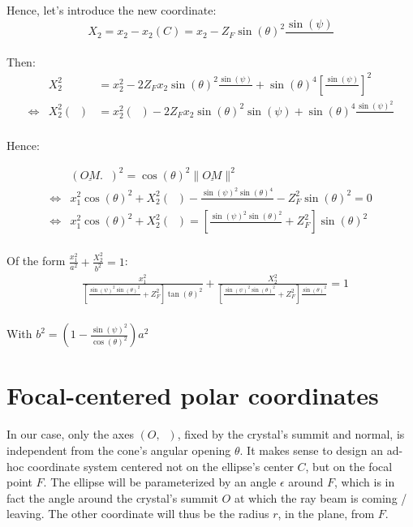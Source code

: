 \documentclass[a4paper,11pt,twoside,titlepage,openright]{book}
\numberwithin{equation}{section}
\newcommand{\lt}{\left}
\newcommand{\rt}{\right}
\DeclareMathOperator{\ez}{\underline{e}_z}
\DeclareMathOperator{\DD}{\cos(\theta)^2 - \sin(\psi)^2}
\begin{document}
Hence, let's introduce the new coordinate:
$$
X_2 = x_2 - x_2(C) = x_2 - Z_F\sin(\theta)^2 \frac{\sin(\psi)}{\DD}
$$

Then:
$$
\begin{array}{lll}
	& X_2^2 & = x_2^2 - 2Z_Fx_2\sin(\theta)^2 \frac{\sin(\psi)}{\DD} + \sin(\theta)^4 \lt[\frac{\sin(\psi)}{\DD}\rt]^2\\
	\Leftrightarrow & X_2^2\lt(\DD\rt) & = x_2^2\lt(\DD\rt) - 2Z_Fx_2\sin(\theta)^2\sin(\psi) + \sin(\theta)^4 \frac{\sin(\psi)^2}{\DD}\\
\end{array}
$$

Hence:

$$
\begin{array}{lll}
	& (\underline{OM}.\ez)^2 = \cos(\theta)^2 \|\underline{OM}\|^2\\
	\Leftrightarrow & x_1^2\cos(\theta)^2 + X_2^2\lt(\DD\rt) - \frac{\sin(\psi)^2\sin(\theta)^4}{\DD} - Z_F^2\sin(\theta)^2 = 0\\
	\Leftrightarrow & x_1^2\cos(\theta)^2 + X_2^2\lt(\DD\rt) = \lt[\frac{\sin(\psi)^2\sin(\theta)^2}{\DD} + Z_F^2\rt]\sin(\theta)^2\\
\end{array}
$$

Of the form $\frac{x_1^2}{a^2} + \frac{X_2^2}{b^2} = 1$:
$$
\begin{array}{lll}
	& \frac{x_1^2}{\lt[\frac{\sin(\psi)^2\sin(\theta)^2}{\DD} + Z_F^2\rt]\tan(\theta)^2} + \frac{X_2^2}{\lt[\frac{\sin(\psi)^2\sin(\theta)^2}{\DD} + Z_F^2\rt]\frac{\sin(\theta)^2}{\DD}} = 1\\
\end{array}
$$

With $b^2 = \lt(1-\frac{\sin(\psi)^2}{\cos(\theta)^2}\rt)a^2$

\section{Focal-centered polar coordinates}

In our case, only the axes $(O, \ez)$, fixed by the crystal's summit and normal, is independent from the cone's angular opening $\theta$.
It makes sense to design an ad-hoc coordinate system centered not on the ellipse's center $C$, but on the focal point $F$.
The ellipse will be parameterized by an angle $\epsilon$ around $F$, which is in fact the angle around the crystal's summit $O$ at which the ray beam is coming / leaving.
The other coordinate will thus be the radius $r$, in the plane, from $F$.
\end{document}
